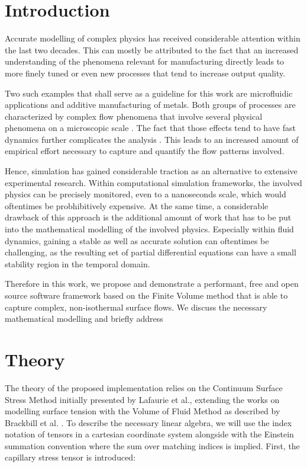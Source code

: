 \documentclass[conference,final]{IEEEtran}
\begin{document}
\section{Introduction}

Accurate modelling of complex physics has received considerable attention within the last two decades.
This can mostly be attributed to the fact that an increased understanding of the phenomena relevant for manufacturing directly leads to more finely tuned or even new processes that tend to increase output quality.

Two such examples that shall serve as a guideline for this work are microfluidic applications and additive manufacturing of metals.
Both groups of processes are characterized by complex flow phenomena that involve several physical phenomena on a microscopic scale \cite{sackmannPresentFutureRole,debroyAdditiveManufacturingMetallic2018}. The fact that those effects tend to have fast dynamics further complicates the analysis \cite{khairallahControllingInterdependentMesonanosecond2020}. This leads to an increased amount of empirical effort necessary to capture and quantify the flow patterns involved.

Hence, simulation has gained considerable traction as an alternative to extensive experimental research. Within computational simulation frameworks, the involved physics can be precisely monitored, even to a nanoseconds scale, which would oftentimes be probhibitively expensive. At the same time, a considerable drawback of this approach is the additional amount of work that has to be put into the mathematical modelling of the involved physics. Especially within fluid dynamics, gaining a stable as well as accurate solution can oftentimes be challenging, as the resulting set of partial differential equations can have a small stability region in the temporal domain.

Therefore in this work, we propose and demonstrate a performant, free and open source software framework based on the Finite Volume method that is able to capture complex, non-isothermal surface flows. We discuss the necessary mathematical modelling and briefly address

\section{Theory}

The theory of the proposed implementation relies on the Continuum Surface Stress Method initially presented by Lafaurie et al., extending the works on modelling surface tension with the Volume of Fluid Method as described by Brackbill et al. \cite{lafaurieModellingMergingFragmentation1994,brackbillContinuumMethodModeling1992}.
To describe the necessary linear algebra, we will use the index notation of tensors in a cartesian coordinate system alongside with the Einstein summation convention where the sum over matching indices is implied. First, the capillary stress tensor is introduced:
\end{document}
